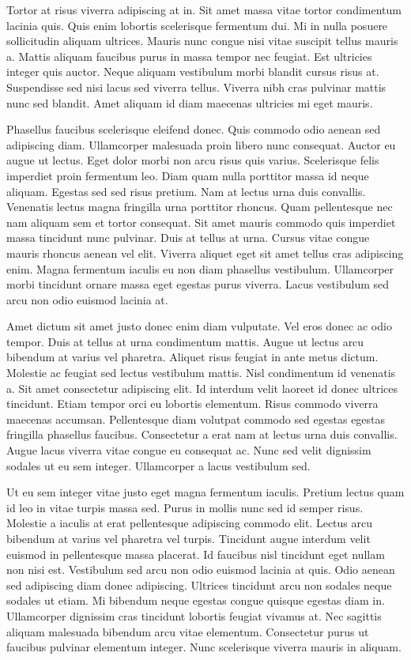 \documentclass[11pt,a4paper]{article}
\begin{document}
Tortor at risus viverra adipiscing at in. Sit amet massa vitae tortor condimentum lacinia quis. Quis enim lobortis scelerisque fermentum dui. Mi in nulla posuere sollicitudin aliquam ultrices. Mauris nunc congue nisi vitae suscipit tellus mauris a. Mattis aliquam faucibus purus in massa tempor nec feugiat. Est ultricies integer quis auctor. Neque aliquam vestibulum morbi blandit cursus risus at. Suspendisse sed nisi lacus sed viverra tellus. Viverra nibh cras pulvinar mattis nunc sed blandit. Amet aliquam id diam maecenas ultricies mi eget mauris.

Phasellus faucibus scelerisque eleifend donec. Quis commodo odio aenean sed adipiscing diam. Ullamcorper malesuada proin libero nunc consequat. Auctor eu augue ut lectus. Eget dolor morbi non arcu risus quis varius. Scelerisque felis imperdiet proin fermentum leo. Diam quam nulla porttitor massa id neque aliquam. Egestas sed sed risus pretium. Nam at lectus urna duis convallis. Venenatis lectus magna fringilla urna porttitor rhoncus. Quam pellentesque nec nam aliquam sem et tortor consequat. Sit amet mauris commodo quis imperdiet massa tincidunt nunc pulvinar. Duis at tellus at urna. Cursus vitae congue mauris rhoncus aenean vel elit. Viverra aliquet eget sit amet tellus cras adipiscing enim. Magna fermentum iaculis eu non diam phasellus vestibulum. Ullamcorper morbi tincidunt ornare massa eget egestas purus viverra. Lacus vestibulum sed arcu non odio euismod lacinia at.

Amet dictum sit amet justo donec enim diam vulputate. Vel eros donec ac odio tempor. Duis at tellus at urna condimentum mattis. Augue ut lectus arcu bibendum at varius vel pharetra. Aliquet risus feugiat in ante metus dictum. Molestie ac feugiat sed lectus vestibulum mattis. Nisl condimentum id venenatis a. Sit amet consectetur adipiscing elit. Id interdum velit laoreet id donec ultrices tincidunt. Etiam tempor orci eu lobortis elementum. Risus commodo viverra maecenas accumsan. Pellentesque diam volutpat commodo sed egestas egestas fringilla phasellus faucibus. Consectetur a erat nam at lectus urna duis convallis. Augue lacus viverra vitae congue eu consequat ac. Nunc sed velit dignissim sodales ut eu sem integer. Ullamcorper a lacus vestibulum sed.

Ut eu sem integer vitae justo eget magna fermentum iaculis. Pretium lectus quam id leo in vitae turpis massa sed. Purus in mollis nunc sed id semper risus. Molestie a iaculis at erat pellentesque adipiscing commodo elit. Lectus arcu bibendum at varius vel pharetra vel turpis. Tincidunt augue interdum velit euismod in pellentesque massa placerat. Id faucibus nisl tincidunt eget nullam non nisi est. Vestibulum sed arcu non odio euismod lacinia at quis. Odio aenean sed adipiscing diam donec adipiscing. Ultrices tincidunt arcu non sodales neque sodales ut etiam. Mi bibendum neque egestas congue quisque egestas diam in. Ullamcorper dignissim cras tincidunt lobortis feugiat vivamus at. Nec sagittis aliquam malesuada bibendum arcu vitae elementum. Consectetur purus ut faucibus pulvinar elementum integer. Nunc scelerisque viverra mauris in aliquam.
\end{document}
